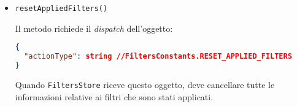 \begin{itemize}
Il metodo richiede il \textit{dispatch} dell'oggetto:
\begin{lstlisting}[language=JSON, caption=Action - remove filter]
{
  "actionType": string, //FiltersConstants.REMOVE_FILTER
  "filter": Filter //Filtro da rimovure, coincide con l'oggetto ricevuto come parametro
}
\end{lstlisting}

Quando \texttt{FiltersStore} riceve questo oggetto, deve rimuovere dai filtri applicati il filtro contenuto nel campo dati \texttt{filter}.


\item \texttt{resetAppliedFilters()}

Il metodo richiede il \textit{dispatch} dell'oggetto:
\begin{lstlisting}[language=JSON, caption=Action - clear assets]
{
  "actionType": string //FiltersConstants.RESET_APPLIED_FILTERS
}
\end{lstlisting}

Quando \texttt{FiltersStore} riceve questo oggetto, deve cancellare tutte le informazioni relative ai filtri che sono stati applicati.

\end{itemize}
